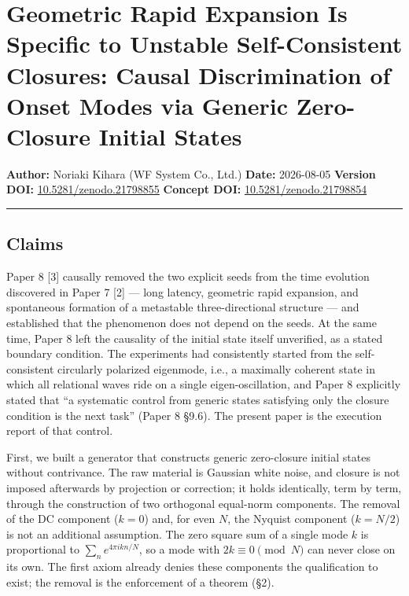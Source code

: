 \documentclass[
  a4paper,
]{article}
\author{}
\date{}
\begin{document}
\section{Geometric Rapid Expansion Is Specific to Unstable
Self-Consistent Closures: Causal Discrimination of Onset Modes via
Generic Zero-Closure Initial
States}\label{geometric-rapid-expansion-is-specific-to-unstable-self-consistent-closures-causal-discrimination-of-onset-modes-via-generic-zero-closure-initial-states}

\textbf{Author:} Noriaki Kihara (WF System Co., Ltd.) \textbf{Date:}
2026-08-05 \textbf{Version DOI:}
\href{https://doi.org/10.5281/zenodo.21798855}{10.5281/zenodo.21798855}
\textbf{Concept DOI:}
\href{https://doi.org/10.5281/zenodo.21798854}{10.5281/zenodo.21798854}

\begin{center}\rule{0.5\linewidth}{0.5pt}\end{center}

\subsection{Claims}\label{claims}

Paper 8 {[}3{]} causally removed the two explicit seeds from the time
evolution discovered in Paper 7 {[}2{]} --- long latency, geometric
rapid expansion, and spontaneous formation of a metastable
three-directional structure --- and established that the phenomenon does
not depend on the seeds. At the same time, Paper 8 left the causality of
the initial state itself unverified, as a stated boundary condition. The
experiments had consistently started from the self-consistent circularly
polarized eigenmode, i.e., a maximally coherent state in which all
relational waves ride on a single eigen-oscillation, and Paper 8
explicitly stated that ``a systematic control from generic states
satisfying only the closure condition is the next task'' (Paper 8 §9.6).
The present paper is the execution report of that control.

First, we built a generator that constructs generic zero-closure initial
states without contrivance. The raw material is Gaussian white noise,
and closure is not imposed afterwards by projection or correction; it
holds identically, term by term, through the construction of two
orthogonal equal-norm components. The removal of the DC component
(\(k=0\)) and, for even \(N\), the Nyquist component (\(k=N/2\)) is not
an additional assumption. The zero square sum of a single mode \(k\) is
proportional to \(\sum_n e^{4\pi ikn/N}\), so a mode with
\(2k\equiv 0 \pmod N\) can never close on its own. The first axiom
already denies these components the qualification to exist; the removal
is the enforcement of a theorem (§2).
\end{document}
